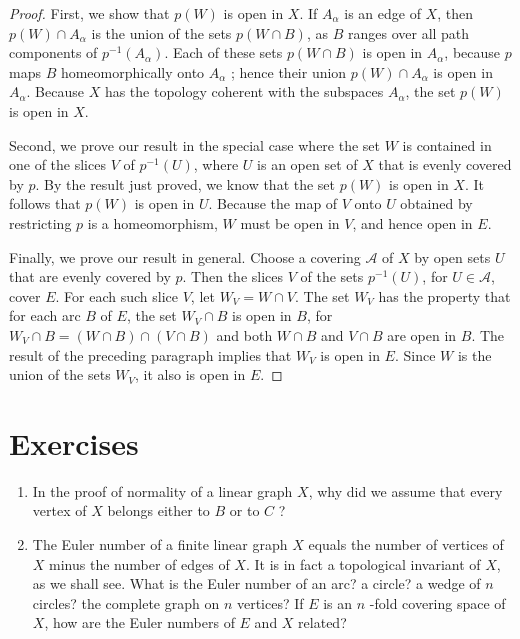 \begin{proof}
First, we show that \(p( W)\) is open in \(X\). If \(A_{\alpha }\) is an edge of \(X\), then \(p( W) \cap {A}_{\alpha }\) is the union of the sets \(p( {W \cap B})\), as \(B\) ranges over all path components of \(p^{-1}( A_{\alpha })\). Each of these sets \(p( {W \cap B})\) is open in \(A_{\alpha }\), because \(p\) maps \(B\) homeomorphically onto \(A_{\alpha }\) ; hence their union \(p( W) \cap {A}_{\alpha }\) is open in \(A_{\alpha }\). Because \(X\) has the topology coherent with the subspaces \(A_{\alpha }\), the set \(p( W)\) is open in \(X\).

Second, we prove our result in the special case where the set \(W\) is contained in one of the slices \(V\) of \(p^{-1}( U)\), where \(U\) is an open set of \(X\) that is evenly covered by \(p\). By the result just proved, we know that the set \(p( W)\) is open in \(X\). It follows that \(p( W)\) is open in \(U\). Because the map of \(V\) onto \(U\) obtained by restricting \(p\) is a homeomorphism, \(W\) must be open in \(V\), and hence open in \(E\).

Finally, we prove our result in general. Choose a covering \(\mathcal{A}\) of \(X\) by open sets \(U\) that are evenly covered by \(p\). Then the slices \(V\) of the sets \(p^{-1}( U)\), for \(U \in \mathcal{A}\), cover \(E\). For each such slice \(V\), let \(W_{V} = W \cap V\). The set \(W_{V}\) has the property that for each arc \(B\) of \(E\), the set \(W_{V} \cap B\) is open in \(B\), for \(W_{V} \cap B = ( {W \cap B}) \cap ( {V \cap B})\) and both \(W \cap B\) and \(V \cap B\) are open in \(B\). The result of the preceding paragraph implies that \(W_{V}\) is open in \(E\). Since \(W\) is the union of the sets \(W_{V}\), it also is open in \(E\).
\end{proof}
\section*{Exercises}
\begin{enumerate}[itemsep=0.4em, parsep=0pt, topsep=0pt, partopsep=0pt, leftmargin=*, label=\arabic*., ref=\arabic*]
\item In the proof of normality of a linear graph \(X\), why did we assume that every vertex of \(X\) belongs either to \(B\) or to \(C\) ?
\item The Euler number of a finite linear graph \(X\) equals the number of vertices of \(X\) minus the number of edges of \(X\). It is in fact a topological invariant of \(X\), as we shall see. What is the Euler number of an arc? a circle? a wedge of \(n\) circles? the complete graph on \(n\) vertices? If \(E\) is an \(n\) -fold covering space of \(X\), how are the Euler numbers of \(E\) and \(X\) related?
\end{enumerate}

